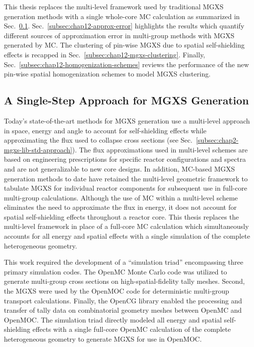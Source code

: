 This thesis replaces the multi-level framework used by traditional \ac{MGXS} generation methods with a single whole-core MC calculation as summarized in Sec.~\ref{subsec:chap12-single-step}. Sec.~\ref{subsec:chap12-approx-error} highlights the results which quantify different sources of approximation error in multi-group methods with \ac{MGXS} generated by \ac{MC}. The clustering of pin-wise \ac{MGXS} due to spatial self-shielding effects is recapped in Sec.~\ref{subsec:chap12-mgxs-clustering}. Finally, Sec.~\ref{subsec:chap12-homogenization-schemes} reviews the performance of the new pin-wise spatial homogenization schemes to model \ac{MGXS} clustering.

\subsection{A Single-Step Approach for MGXS Generation}
\label{subsec:chap12-single-step}

Today's state-of-the-art methods for \ac{MGXS} generation use a multi-level approach in space, energy and angle to account for self-shielding effects while approximating the flux used to collapse cross sections (see Sec.~\ref{subsec:chap2-mgxs-lib-std-approach}). The flux approximations used in multi-level schemes are based on engineering prescriptions for specific reactor configurations and spectra and are not generalizable to new core designs. In addition, \ac{MC}-based \ac{MGXS} generation methods to date have retained the multi-level geometric framework to tabulate MGXS for individual reactor components for subsequent use in full-core multi-group calculations. Although the use of MC within a multi-level scheme eliminates the need to approximate the flux in energy, it does not account for spatial self-shielding effects throughout a reactor core. This thesis replaces the multi-level framework in place of a full-core \ac{MC} calculation which simultaneously accounts for all energy and spatial effects with a single simulation of the complete heterogeneous geometry.

This work required the development of a ``simulation triad'' encompassing three primary simulation codes. The OpenMC Monte Carlo code was utilized to generate multi-group cross sections on high-spatial-fidelity tally meshes. Second, the \ac{MGXS} were used by the OpenMOC code for deterministic multi-group transport calculations. Finally, the OpenCG library enabled the processing and transfer of tally data on combinatorial geometry meshes between OpenMC and OpenMOC. The simulation triad directly modeled all energy and spatial self-shielding effects with a single full-core OpenMC calculation of the complete heterogeneous geometry to generate \ac{MGXS} for use in OpenMOC.

